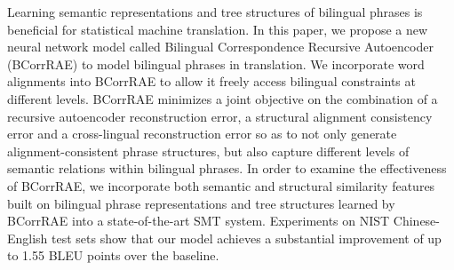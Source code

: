 Learning semantic representations and tree structures of bilingual phrases is beneficial for statistical machine translation. In this paper, we propose a new neural network model called Bilingual Correspondence Recursive Autoencoder (BCorrRAE) to model bilingual phrases in translation. We incorporate word alignments into BCorrRAE to allow it freely access bilingual constraints at different levels. BCorrRAE minimizes a joint objective on the combination of a recursive autoencoder reconstruction error, a structural alignment consistency error and a cross-lingual reconstruction error so as to not only generate alignment-consistent phrase structures, but also capture different levels of semantic relations within bilingual phrases. In order to examine the effectiveness of BCorrRAE, we incorporate both semantic and structural similarity features built on bilingual phrase representations and tree structures learned by BCorrRAE into a state-of-the-art SMT system. Experiments on NIST Chinese-English test sets show that our model achieves a substantial improvement of up to 1.55 BLEU points over the baseline.
